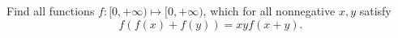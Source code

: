 Find all functions $f:[0,+\infty) \mapsto [0,+\infty)$, which for all nonnegative $x,y$ satisfy $$f(f(x)+f(y))=xyf(x+y).$$
